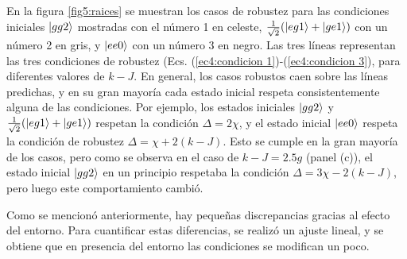 En la figura \ref{fig5:raices} se muestran los casos de robustez para las condiciones iniciales $\ket{gg2}$ mostradas con el número 1 en celeste, $\frac{1}{\sqrt{2}}(\ket{eg1}+\ket{ge1})$ con un número 2 en gris, y $\ket{ee0}$ con un número 3 en negro. Las tres líneas representan las tres condiciones de robustez (Ecs. (\ref{ec4:condicion 1})-(\ref{ec4:condicion 3}), para diferentes valores de $k-J$. En general, los casos robustos caen sobre las líneas predichas, y en su gran mayoría cada estado inicial respeta consistentemente alguna de las condiciones. Por ejemplo, los estados iniciales $\ket{gg2}$ y $\frac{1}{\sqrt{2}}(\ket{eg1}+\ket{ge1})$ respetan la condición $\Delta=2\chi$, y el estado inicial $\ket{ee0}$ respeta la condición de robustez $\Delta=\chi+2(k-J)$. Esto se cumple en la gran mayoría de los casos, pero como se observa en el caso de $k-J=2.5g$ (panel (c)), el estado inicial $\ket{gg2}$ en un principio respetaba la condición $\Delta=3\chi-2(k-J)$, pero luego este comportamiento cambió. 

Como se mencionó anteriormente, hay pequeñas discrepancias gracias al efecto del entorno. Para cuantificar estas diferencias, se realizó un ajuste lineal, y se obtiene que en presencia del entorno las condiciones se modifican un poco.

